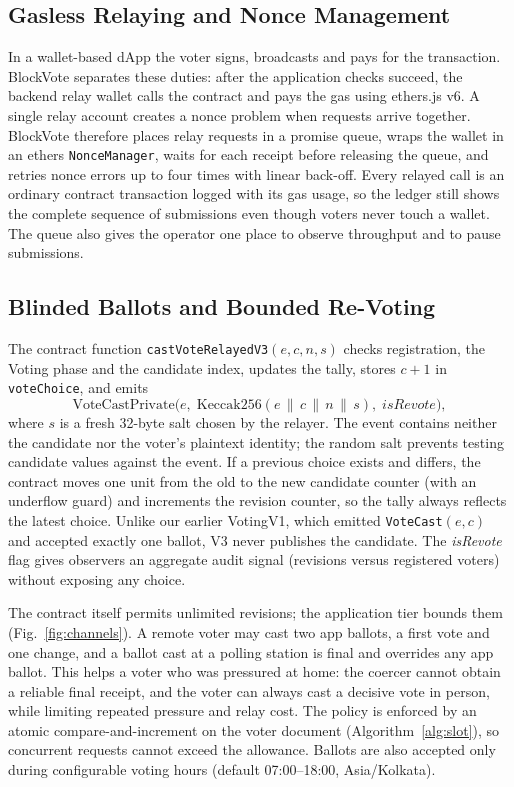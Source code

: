 \documentclass[conference]{IEEEtran}
\newcommand{\code}[1]{\texttt{\small #1}}
\begin{document}
\subsection{Gasless Relaying and Nonce Management}
In a wallet-based dApp the voter signs, broadcasts and pays for the transaction. BlockVote separates these duties: after the application checks succeed, the backend relay wallet calls the contract and pays the gas using ethers.js v6. A single relay account creates a nonce problem when requests arrive together. BlockVote therefore places relay requests in a promise queue, wraps the wallet in an ethers \code{NonceManager}, waits for each receipt before releasing the queue, and retries nonce errors up to four times with linear back-off. Every relayed call is an ordinary contract transaction logged with its gas usage, so the ledger still shows the complete sequence of submissions even though voters never touch a wallet. The queue also gives the operator one place to observe throughput and to pause submissions.

\subsection{Blinded Ballots and Bounded Re-Voting}
The contract function \code{castVoteRelayedV3}$(e,c,n,s)$ checks registration, the Voting phase and the candidate index, updates the tally, stores $c+1$ in \code{voteChoice}, and emits
\begin{equation}
\text{VoteCastPrivate}\big(e,\;\mathrm{Keccak256}(e\,\|\,c\,\|\,n\,\|\,s),\;\mathit{isRevote}\big),
\label{eq:ballot}
\end{equation}
where $s$ is a fresh 32-byte salt chosen by the relayer. The event contains neither the candidate nor the voter's plaintext identity; the random salt prevents testing candidate values against the event. If a previous choice exists and differs, the contract moves one unit from the old to the new candidate counter (with an underflow guard) and increments the revision counter, so the tally always reflects the latest choice. Unlike our earlier VotingV1, which emitted \code{VoteCast}$(e,c)$ and accepted exactly one ballot, V3 never publishes the candidate. The \emph{isRevote} flag gives observers an aggregate audit signal (revisions versus registered voters) without exposing any choice.

The contract itself permits unlimited revisions; the application tier bounds them (Fig.~\ref{fig:channels}). A remote voter may cast two app ballots, a first vote and one change, and a ballot cast at a polling station is final and overrides any app ballot. This helps a voter who was pressured at home: the coercer cannot obtain a reliable final receipt, and the voter can always cast a decisive vote in person, while limiting repeated pressure and relay cost. The policy is enforced by an atomic compare-and-increment on the voter document (Algorithm~\ref{alg:slot}), so concurrent requests cannot exceed the allowance. Ballots are also accepted only during configurable voting hours (default 07:00--18:00, Asia/Kolkata).
\end{document}
